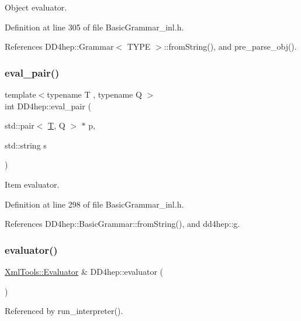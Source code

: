 Object evaluator. 



Definition at line 305 of file Basic\+Grammar\+\_\+inl.\+h.



References D\+D4hep\+::\+Grammar$<$ T\+Y\+P\+E $>$\+::from\+String(), and pre\+\_\+parse\+\_\+obj().

\hypertarget{namespace_d_d4hep_a361a40f1b013a4c6f067e5ad69cf8f7a}{}\label{namespace_d_d4hep_a361a40f1b013a4c6f067e5ad69cf8f7a} 
\subsubsection{\texorpdfstring{eval\+\_\+pair()}{eval\_pair()}}
{\footnotesize\ttfamily template$<$typename T , typename Q $>$ \\
int D\+D4hep\+::eval\+\_\+pair (\begin{DoxyParamCaption}\item[{std\+::pair$<$ \hyperlink{class_t}{T}, Q $>$ $\ast$}]{p,  }\item[{std\+::string}]{s }\end{DoxyParamCaption})\hspace{0.3cm}{\ttfamily [inline]}}



Item evaluator. 



Definition at line 298 of file Basic\+Grammar\+\_\+inl.\+h.



References D\+D4hep\+::\+Basic\+Grammar\+::from\+String(), and dd4hep\+::g.

\hypertarget{namespace_d_d4hep_a5a6983dcc5d95a8aad6910ad842f0b6e}{}\label{namespace_d_d4hep_a5a6983dcc5d95a8aad6910ad842f0b6e} 
\subsubsection{\texorpdfstring{evaluator()}{evaluator()}}
{\footnotesize\ttfamily \hyperlink{class_xml_tools_1_1_evaluator}{Xml\+Tools\+::\+Evaluator} \& D\+D4hep\+::evaluator (\begin{DoxyParamCaption}{ }\end{DoxyParamCaption})}



Referenced by run\+\_\+interpreter().

